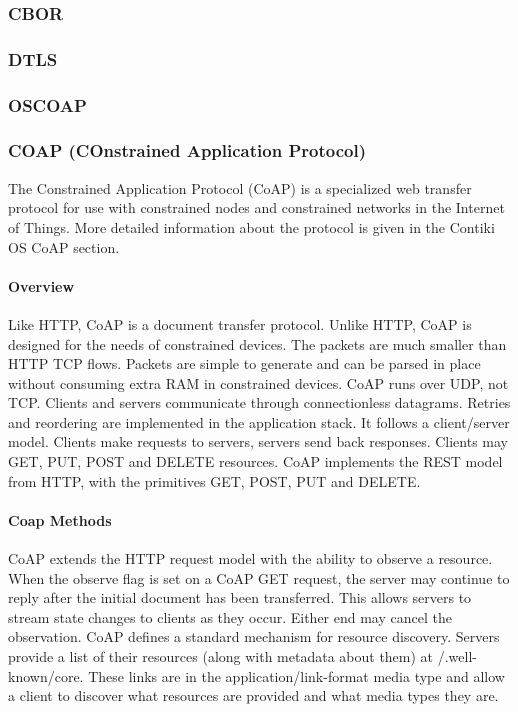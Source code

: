 \subsubsection{CBOR}
\subsubsection{DTLS}
\subsubsection{OSCOAP}

\subsubsection{COAP (COnstrained Application Protocol)}

The Constrained Application Protocol (CoAP) is a specialized web transfer protocol for use with constrained nodes and constrained networks in the Internet of Things.
More detailed information about the protocol is given in the Contiki OS CoAP section.

\paragraph{Overview}
Like HTTP,
	CoAP is a document transfer protocol.
Unlike HTTP,
	CoAP is designed for the needs of constrained devices.
The packets are much smaller than HTTP TCP flows.
Packets are simple to generate and can be parsed in place without consuming extra RAM in constrained devices.
CoAP runs over UDP,
	not TCP.
Clients and servers communicate through connectionless datagrams.
Retries and reordering are implemented in the application stack.
It follows a client/server model.
Clients make requests to servers,
	servers send back responses.
Clients may GET,
	PUT,
	POST and DELETE resources.
CoAP implements the REST model from HTTP,
	with the primitives GET,
	POST,
	PUT and DELETE.

\paragraph{Coap Methods}
CoAP extends the HTTP request model with the ability to observe a resource.
When the observe flag is set on a CoAP GET request,
	the server may continue to reply after the initial document has been transferred. This allows servers to stream state
	changes to clients as they occur. Either end may cancel the observation.
	CoAP defines a standard mechanism for resource discovery. Servers provide a list
	of their resources (along with metadata about them) at /.well-known/core. These links
	are in the application/link-format media type and allow a client to discover what
	resources are provided and what media types they are.

